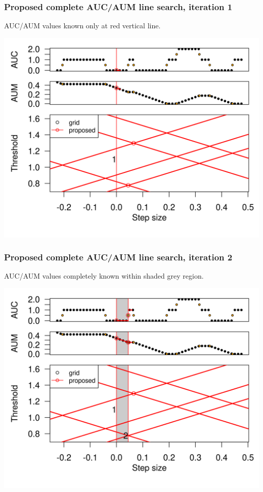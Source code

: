 
\begin{frame}
  \frametitle{Proposed complete AUC/AUM line search, iteration 1}
AUC/AUM values known only at red vertical line.


  \includegraphics[width=\textwidth]{figure-line-search-example-1}


\end{frame}


\begin{frame}
  \frametitle{Proposed complete AUC/AUM line search, iteration 2}
AUC/AUM values completely known within shaded grey region.


  \includegraphics[width=\textwidth]{figure-line-search-example-2}


\end{frame}


